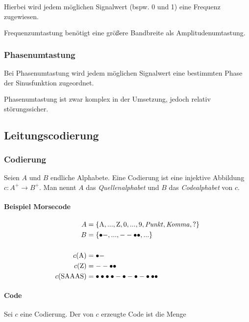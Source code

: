 \documentclass[a4paper, 14pt]{article}
\begin{document}
	Hierbei wird jedem möglichen Signalwert (bspw. 0 und 1) eine Frequenz zugewiesen.

	Frequenzumtastung benötigt eine größere Bandbreite als Amplitudenumtastung.

	\subsubsection{Phasenumtastung}

	Bei Phasenumtastung wird jedem möglichen Signalwert eine bestimmten Phase der Sinusfunktion zugeordnet.

	Phasenumtastung ist zwar komplex in der Umsetzung, jedoch relativ störungssicher.

	\subsection{Leitungscodierung}

	\subsubsection{Codierung}

	Seien $A$ und $B$ endliche Alphabete.
	Eine Codierung ist eine injektive Abbildung $c : A^+ \to B^+$.
	Man nennt $A$ das \emph{Quellenalphabet} und $B$ das \emph{Codealphabet} von $c$.

	\paragraph{Beispiel Morsecode}

	\begin{align*}
		A &= \{\text{A}, ..., \text{Z}, 0, ..., 9, \text{\emph{Punkt}}, \text{\emph{Komma}}, \text{?}\} \\
		B &= \{\bullet-, ..., --\bullet\bullet, ...\} \\
		\\
		c(\text{A}) &= \bullet- \\
		c(\text{Z}) &= --\bullet\bullet \\
		c(\text{SAAAS}) &= \bullet\bullet\bullet\bullet-\bullet-\bullet-\bullet\bullet\bullet
	\end{align*}

	\paragraph{Code}

	Sei $c$ eine Codierung.
	Der von $c$ erzeugte Code ist die Menge
\end{document}
